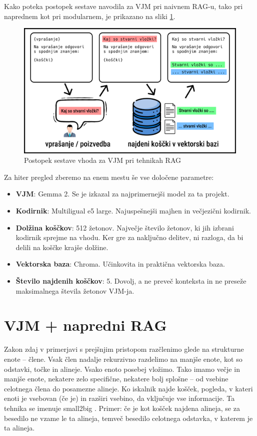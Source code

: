 \documentclass[a4paper,12pt,openright]{book}
\begin{document}
Kako poteka postopek sestave navodila za VJM pri naivnem RAG-u, tako pri naprednem kot pri modularnem, je prikazano na sliki \ref{template}.

\begin{figure}[htbp]
	\centering
	\includegraphics[width=\textwidth]{template.png}
	\caption{Postopek sestave vhoda za VJM pri tehnikah RAG}
	\label{template}
\end{figure}

Za hiter pregled zberemo na enem mestu še vse določene parametre:

\begin{itemize}
	\item \textbf{VJM}: Gemma 2. Se je izkazal za najprimernejši model za ta projekt.
	\item \textbf{Kodirnik}: Multiligual e5 large. Najuspešnejši majhen in večjezični kodirnik.
	\item \textbf{Dolžina koščkov}: 512 žetonov. Največje število žetonov, ki jih izbrani kodirnik sprejme na vhodu. Ker gre za naključno delitev, ni razloga, da bi delili na koščke krajše dolžine.
	\item \textbf{Vektorska baza}: Chroma. Učinkovita in praktična vektorska baza.
	\item \textbf{Število najdenih koščkov}: 5. Dovolj, a ne preveč konteksta in ne preseže maksimalnega števila žetonov VJM-ja.
\end{itemize}

\section{VJM + napredni RAG}

Zakon zdaj v primerjavi s prejšnjim pristopom razčlenimo glede na strukturne enote – člene. Vsak člen nadalje rekurzivno razdelimo na manjše enote, kot so odstavki, točke in alineje. Vsako enoto posebej vložimo. Tako imamo večje in manjše enote, nekatere zelo specifične, nekatere bolj splošne – od vsebine celotnega člena do posamezne alineje. Ko iskalnik najde košček, pogleda, v kateri enoti je vsebovan (če je) in razširi vsebino, da vključuje vse informacije. Ta tehnika se imenuje small2big \cite{small2big}. Primer: če je kot košček najdena alineja, se za besedilo ne vzame le ta alineja, temveč besedilo celotnega odstavka, v katerem je ta alineja.
\end{document}
